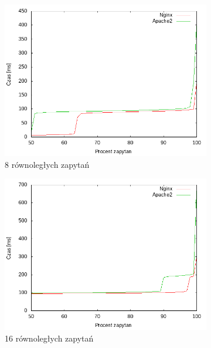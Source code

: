 \begin{figure}
	\begin{subfigure}[h]{0.3\textwidth}
		\includegraphics[width=\textwidth]{testy/wybor_fib_15_8.png}
		\caption{8 równoległych zapytań}
	\end{subfigure}
	\begin{subfigure}[h]{0.3\textwidth}
		\includegraphics[width=\textwidth]{testy/wybor_fib_15_16.png}
		\caption{16 równoległych zapytań}
	\end{subfigure}
	\begin{subfigure}[h]{0.3\textwidth}

\end{subfigure}
\end{figure}

